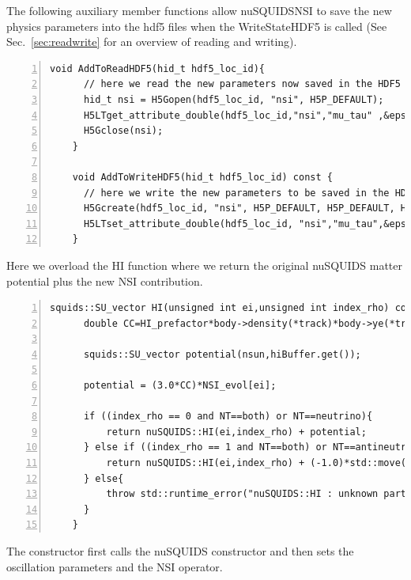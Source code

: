 \documentclass[3p,12pt]{elsarticle}
\newcommand{\ttf}{\ttfamily}
\begin{document}
The following auxiliary member functions allow {\ttf nuSQUIDSNSI} to
save the new physics parameters into the hdf5 files when the
{\ttf WriteStateHDF5} is called (See Sec.~\ref{sec:readwrite} for an overview of reading and writing).

\begin{lstlisting}[frame=leftline, numbers =
  left,breaklines=true,label = ex:sin1,firstnumber=last]
    void AddToReadHDF5(hid_t hdf5_loc_id){
      // here we read the new parameters now saved in the HDF5 file
      hid_t nsi = H5Gopen(hdf5_loc_id, "nsi", H5P_DEFAULT);
      H5LTget_attribute_double(hdf5_loc_id,"nsi","mu_tau" ,&epsilon_mutau);
      H5Gclose(nsi);
    }

    void AddToWriteHDF5(hid_t hdf5_loc_id) const {
      // here we write the new parameters to be saved in the HDF5 file
      H5Gcreate(hdf5_loc_id, "nsi", H5P_DEFAULT, H5P_DEFAULT, H5P_DEFAULT);
      H5LTset_attribute_double(hdf5_loc_id, "nsi","mu_tau",&epsilon_mutau, 1);
    }
\end{lstlisting}

Here we overload the {\ttf HI} function where we return the original {\ttf nuSQUIDS}
matter potential plus the new NSI contribution.

\begin{lstlisting}[frame=leftline, numbers =
  left,breaklines=true,label = ex:sin1,firstnumber=last]
    squids::SU_vector HI(unsigned int ei,unsigned int index_rho) const{
      double CC=HI_prefactor*body->density(*track)*body->ye(*track);

      squids::SU_vector potential(nsun,hiBuffer.get());

      potential = (3.0*CC)*NSI_evol[ei];

      if ((index_rho == 0 and NT==both) or NT==neutrino){
          return nuSQUIDS::HI(ei,index_rho) + potential;
      } else if ((index_rho == 1 and NT==both) or NT==antineutrino){
          return nuSQUIDS::HI(ei,index_rho) + (-1.0)*std::move(potential);
      } else{
          throw std::runtime_error("nuSQUIDS::HI : unknown particle or antiparticle");
      }
    }
\end{lstlisting}

The constructor first calls the
{\ttf nuSQUIDS} constructor and then sets the oscillation
parameters and the NSI operator.
\end{document}
